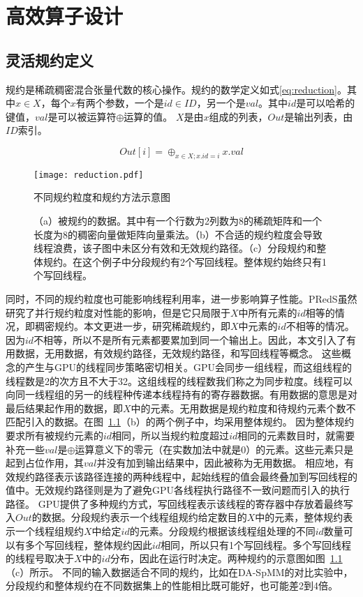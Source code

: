 
\chapter{高效算子设计}

\section{灵活规约定义}\label{sec:flexible-reduciton}
规约是稀疏稠密混合张量代数的核心操作。规约的数学定义如式\eqref{eq:reduction}。其中$x \in X$，每个$x$有两个参数，一个是$id\in ID$，另一个是$val$。其中$id$是可以哈希的键值，$val$是可以被运算符$\oplus$运算的值。
$X$是由$x$组成的列表，$Out$是输出列表，由$ID$索引。

\begin{equation}
  Out[i] = \oplus_{x\in X;x.id=i} x.val
  \label{eq:reduction}
\end{equation}
\begin{figure}[h]%
  \centering
  \texttt{[image: reduction.pdf]}
  \caption{不同规约粒度和规约方法示意图}
  \caption*{（a）被规约的数据。其中有一个行数为2列数为8的稀疏矩阵和一个长度为8的稠密向量做矩阵向量乘法。（b）不合适的规约粒度会导致线程浪费，该子图中未区分有效和无效规约路径。（c）分段规约和整体规约。在这个例子中分段规约有2个写回线程。整体规约始终只有1个写回线程。}
  \label{fig:reductions}
\end{figure}
同时，不同的规约粒度也可能影响线程利用率，进一步影响算子性能。PRedS\cite{yu2021exploiting}虽然研究了并行规约粒度对性能的影响，但是它只局限于$X$中所有元素的$id$相等的情况，即稠密规约。本文更进一步，研究稀疏规约，即$X$中元素的$id$不相等的情况。
因为$id$不相等，所以不是所有元素都要累加到同一个输出上。因此，本文引入了有用数据，无用数据，有效规约路径，无效规约路径，和写回线程等概念。
这些概念的产生与GPU的线程同步策略密切相关。GPU会同步一组线程，而这组线程的线程数是2的次方且不大于32。这组线程的线程数我们称之为同步粒度。线程可以向同一线程组的另一的线程种传递本线程持有的寄存器数据。有用数据的意思是对最后结果起作用的数据，即$X$中的元素。无用数据是规约粒度和待规约元素个数不匹配引入的数据。在图~\ref{fig:reductions}（b）的两个例子中，均采用整体规约。
因为整体规约要求所有被规约元素的$id$相同，所以当规约粒度超过$id$相同的元素数目时，就需要补充一些$val$是$\oplus$运算意义下的零元（在实数加法中就是0）的元素。这些元素只是起到占位作用，其$val$并没有加到输出结果中，因此被称为无用数据。
相应地，有效规约路径表示该路径连接的两种线程中，起始线程的值会最终叠加到写回线程的值中。无效规约路径则是为了避免GPU各线程执行路径不一致问题而引入的执行路径。
GPU提供了多种规约方式，写回线程表示该线程的寄存器中存放着最终写入$Out$的数据。分段规约表示一个线程组规约给定数目的$X$中的元素，整体规约表示一个线程组规约$X$中给定$id$的元素。分段规约根据该线程组处理的不同$id$数量可以有多个写回线程，整体规约因此$id$相同，所以只有1个写回线程。多个写回线程的线程号取决于$X$中的$id$分布，因此在运行时决定。两种规约的示意图如图~\ref{fig:reductions}（c）所示。
不同的输入数据适合不同的规约，比如在DA-SpMM\cite{dai2022heuristic}的对比实验中，分段规约和整体规约在不同数据集上的性能相比既可能好，也可能差2到4倍。

